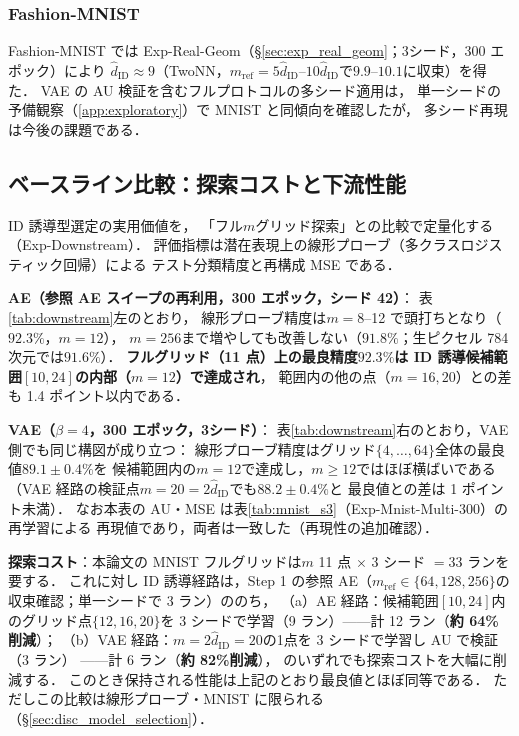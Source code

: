 \documentclass[11pt,a4paper]{jsarticle}
\newcommand{\hatdID}{\hat{d}_{\mathrm{ID}}}
\begin{document}
\subsubsection{Fashion-MNIST}

Fashion-MNIST では Exp-Real-Geom（§\ref{sec:exp_real_geom}；3シード，300 エポック）により
$\hatdID \approx 9$（TwoNN，$m_{\mathrm{ref}} = 5\hatdID$--$10\hatdID$で$9.9$--$10.1$に収束）を得た．
VAE の AU 検証を含むフルプロトコルの多シード適用は，
単一シードの予備観察（\ref{app:exploratory}）で MNIST と同傾向を確認したが，
多シード再現は今後の課題である．

\subsection{ベースライン比較：探索コストと下流性能}\label{sec:exp_downstream}

ID 誘導型選定の実用価値を，
「フル$m$グリッド探索」との比較で定量化する（Exp-Downstream）．
評価指標は潜在表現上の線形プローブ（多クラスロジスティック回帰）による
テスト分類精度と再構成 MSE である．

\textbf{AE（参照 AE スイープの再利用，300 エポック，シード 42）}：
表\ref{tab:downstream}左のとおり，
線形プローブ精度は$m = 8$--12 で頭打ちとなり（$92.3\%$，$m = 12$），
$m = 256$まで増やしても改善しない（$91.8\%$；生ピクセル 784 次元では$91.6\%$）．
\textbf{フルグリッド（11 点）上の最良精度$92.3\%$は
ID 誘導候補範囲$[10, 24]$の内部（$m = 12$）で達成され}，
範囲内の他の点（$m = 16, 20$）との差も 1.4 ポイント以内である．

\textbf{VAE（$\beta = 4$，300 エポック，3シード）}：
表\ref{tab:downstream}右のとおり，VAE 側でも同じ構図が成り立つ：
線形プローブ精度はグリッド$\{4, \ldots, 64\}$全体の最良値$89.1 \pm 0.4\%$を
候補範囲内の$m = 12$で達成し，$m \geq 12$ではほぼ横ばいである
（VAE 経路の検証点$m = 20 = 2\hatdID$でも$88.2 \pm 0.4\%$と
最良値との差は 1 ポイント未満）．
なお本表の AU・MSE は表\ref{tab:mnist_s3}（Exp-Mnist-Multi-300）の再学習による
再現値であり，両者は一致した（再現性の追加確認）．

\textbf{探索コスト}：本論文の MNIST フルグリッドは$m$ 11 点
$\times$ 3 シード $= 33$ ランを要する．
これに対し ID 誘導経路は，Step 1 の参照 AE（$m_{\mathrm{ref}} \in \{64, 128, 256\}$の
収束確認；単一シードで 3 ラン）ののち，
（a）AE 経路：候補範囲$[10, 24]$内のグリッド点$\{12, 16, 20\}$を
3 シードで学習（9 ラン）——計 12 ラン（\textbf{約 64\%削減}）；
（b）VAE 経路：$m = 2\hatdID = 20$の1点を 3 シードで学習し AU で検証（3 ラン）
——計 6 ラン（\textbf{約 82\%削減}），
のいずれでも探索コストを大幅に削減する．
このとき保持される性能は上記のとおり最良値とほぼ同等である．
ただしこの比較は線形プローブ・MNIST に限られる（§\ref{sec:disc_model_selection}）．
\end{document}
